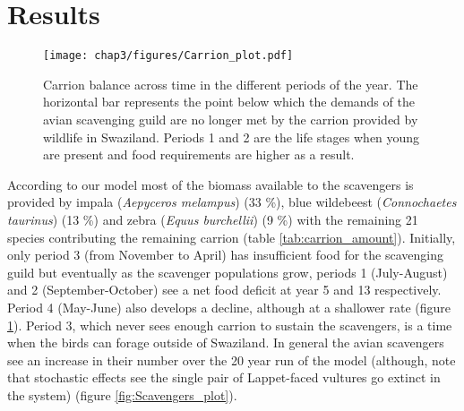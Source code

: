 \section{\uppercase{R}esults}

\begin{figure}[H] %
	  \centering
	  \texttt{[image: chap3/figures/Carrion\_plot.pdf]}
	    \caption[Balance of carrion availability across time in Swaziland] %
	    {Carrion balance across time in the different periods of the year. The horizontal bar represents the point below which the demands of the avian scavenging guild are no longer met by the carrion provided by wildlife in Swaziland. Periods 1 and 2 are the life stages when young are present and food requirements are higher as a result. }%
	  \label{fig:Carrion_plot}
	\end{figure}
	


According to our model most of the biomass available to the scavengers is provided by impala (\textit{Aepyceros melampus}) (33 \%), blue wildebeest (\textit{Connochaetes taurinus}) (13 \%) and zebra (\textit{Equus burchellii}) (9 \%) with the remaining 21 species contributing the remaining carrion (table \ref{tab:carrion_amount}). Initially, only period 3 (from November to April) has insufficient food for the scavenging guild but eventually as the scavenger populations grow, periods 1 (July-August) and 2 (September-October) see a net food deficit at year 5 and 13 respectively. Period 4 (May-June) also develops a decline, although at a shallower rate (figure \ref{fig:Carrion_plot}). Period 3, which never sees enough carrion to sustain the scavengers, is a time when the birds can forage outside of Swaziland.  In general the avian scavengers see an increase in their number over the 20 year run of the model (although, note that stochastic effects see the single pair of Lappet-faced vultures go extinct in the system) (figure \ref{fig:Scavengers_plot}). 




